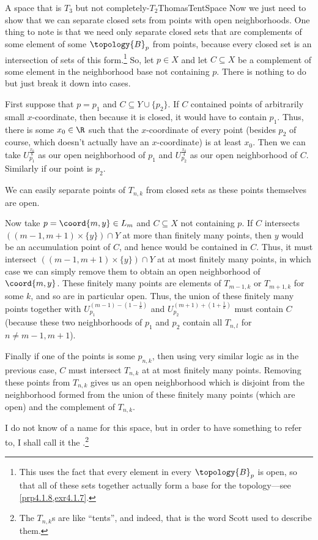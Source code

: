 \begin{exm}{A space that is $T_3$ but not completely-$T_2$}{ThomasTentSpace}
Now we just need to show that we can separate closed sets from points with open neighborhoods.  One thing to note is that we need only separate closed sets that are complements of some element of some $\topology{B}_p$ from points, because every closed set is an intersection of sets of this form.\footnote{This uses the fact that every element in every $\topology{B}_p$ is open, so that all of these sets together actually form a base for the topology---see \cref{prp4.1.8,exr4.1.7}.}  So, let $p\in X$ and let $C\subseteq X$ be a complement of some element in the neighborhood base not containing $p$.  There is nothing to do but just break it down into cases.

First suppose that $p=p_1$ and $C\subseteq Y\cup \{ p_2\}$.  If $C$ contained points of arbitrarily small $x$-coordinate, then because it is closed, it would have to contain $p_1$.  Thus, there is some $x_0\in \R$ such that the $x$-coordinate of every point (besides $p_2$ of course, which doesn't actually have an $x$-coordinate) is at least $x_0$.  Then we can take $U_{p_1}^{\frac{x_0}{8}}$ as our open neighborhood of $p_1$ and $U_{p_2}^{\frac{x_0}{4}}$ as our open neighborhood of $C$.  Similarly if our point is $p_2$.

We can easily separate points of $T_{n,k}$ from closed sets as these points themselves are open.

Now take $p=\coord{m,y}\in L_m$ and $C\subseteq X$ not containing $p$.  If $C$ intersects $((m-1,m+1)\times \{ y\} )\cap Y$ at more than finitely many points, then $y$ would be an accumulation point of $C$, and hence would be contained in $C$.  Thus, it must intersect $((m-1,m+1)\times \{ y\})\cap Y$ at at most finitely many points, in which case we can simply remove them to obtain an open neighborhood of $\coord{m,y}$.  These finitely many points are elements of $T_{m-1,k}$ or $T_{m+1,k}$ for some $k$, and so are in particular open.  Thus, the union of these finitely many points together with $U_{p_1}^{(m-1)-(1-\frac{1}{k})}$ and $U_{p_2}^{(m+1)+(1+\frac{1}{k})}$ must contain $C$ (because these two neighborhoods of $p_1$ and $p_2$ contain all $T_{n,l}$ for $n\neq m-1,m+1$).

Finally if one of the points is some $p_{n,k}$, then using very similar logic as in the previous case, $C$ must intersect $T_{n,k}$ at at most finitely many points.  Removing these points from $T_{n,k}$ gives us an open neighborhood which is disjoint from the neighborhood formed from the union of these finitely many points (which are open) and the complement of $T_{n,k}$.
\begin{rmk}
I do not know of a name for this space, but in order to have something to refer to, I shall call it the .\footnote{The $T_{n,k}$s are like ``tents'', and indeed, that is the word Scott used to describe them.}
\end{rmk}
\end{exm}

